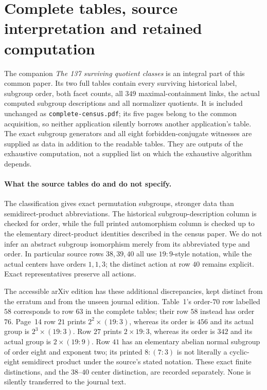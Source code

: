 \section{Complete tables, source interpretation and retained computation}
The companion \emph{The 137 surviving quotient classes} is an integral part of this common paper. Its two full tables contain every surviving historical label, subgroup order, both facet counts, all $349$ maximal-containment links, the actual computed subgroup descriptions and all normalizer quotients. It is included unchanged as \texttt{complete-census.pdf}; its five pages belong to the common acquisition, so neither application silently borrows another application's table. The exact subgroup generators and all eight forbidden-conjugate witnesses are supplied as data in addition to the readable tables. They are outputs of the exhaustive computation, not a supplied list on which the exhaustive algorithm depends.

\paragraph{What the source tables do and do not specify.}
The classification gives exact permutation subgroups, stronger data than semidirect-product abbreviations. The historical subgroup-description column is checked for order, while the full printed automorphism column is checked up to the elementary direct-product identities described in the census paper. We do not infer an abstract subgroup isomorphism merely from its abbreviated type and order. In particular source rows $38,39,40$ all use $19:9$-style notation, while the actual centers have orders $1,1,3$; the distinct action at row $40$ remains explicit. Exact representatives preserve all actions.

The accessible arXiv edition has these additional discrepancies, kept distinct from the erratum and from the unseen journal edition. Table~1's order-$70$ row labelled $58$ corresponds to row $63$ in the complete tables; their row $58$ instead has order $76$. Page~14 row $21$ prints $2^2\times(19:3)$, whereas its order is $456$ and its actual group is $2^3\times(19:3)$. Row $27$ prints $2\times19:3$, whereas its order is $342$ and its actual group is $2\times(19:9)$. Row $41$ has an elementary abelian normal subgroup of order eight and exponent two; its printed $8:(7:3)$ is not literally a cyclic-eight semidirect product under the source's stated notation. These exact finite distinctions, and the $38$--$40$ center distinction, are recorded separately. None is silently transferred to the journal text.

